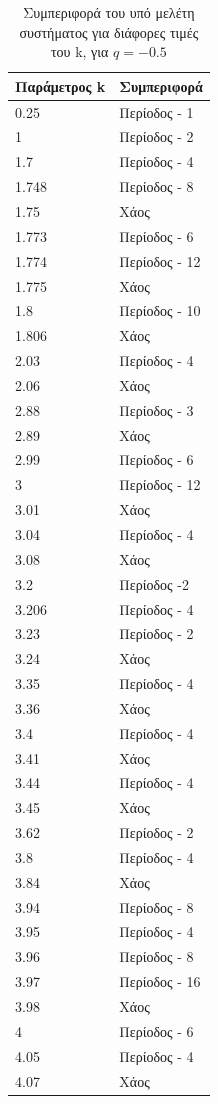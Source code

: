 \begin{table}[ht]
	\centering
	\caption{ Συμπεριφορά του υπό μελέτη συστήματος για διάφορες τιμές του k, για $q=-0.5$ }
	\label{tab:abc11}
	\begin{tabular}{l | l}
		Παράμετρος k & Συμπεριφορά \\
		\hline
		0.25 &  Περίοδος -  1 \\
		1 &  Περίοδος -  2 \\
		1.7& Περίοδος -  4 \\
		1.748& Περίοδος -  8 \\
		1.75 & Xάος \\
		1.773& Περίοδος - 6 \\
		1.774& Περίοδος - 12\\
		1.775& Χάος \\
		1.8& Περίοδος - 10 \\
		1.806 &  Χάος \\
		2.03 &  Περίοδος -  4\\
		2.06 &Χάος \\
		2.88& Περίοδος -  3\\
		2.89 & Χάος\\
		2.99 &  Περίοδος -  6\\
		3 &  Περίοδος - 12\\
		3.01 &  Χάος\\
		3.04 & Περίοδος - 4\\
		3.08 & Χάος\\
		3.2 & Περίοδος -2\\
		3.206 & Περίοδος -  4\\
		3.23 & Περίοδος -  2\\
		3.24 & Χάος\\
		3.35 & Περίοδος -  4\\
		3.36 & Χάος\\
		3.4 & Περίοδος -  4\\
		3.41 & Χάος\\
		3.44 & Περίοδος -  4\\
		3.45 & Χάος\\
		3.62 & Περίοδος -  2\\
		3.8 & Περίοδος -  4\\
		3.84 & Χάος\\
		3.94 & Περίοδος -  8\\
		3.95 & Περίοδος -  4\\
		3.96 & Περίοδος -  8\\
		3.97 & Περίοδος -  16\\
		3.98 & Χάος\\
		4 & Περίοδος -  6\\
		4.05&Περίοδος - 4\\
		4.07 & Χάος\\
		
	\end{tabular}
	
\end{table}


